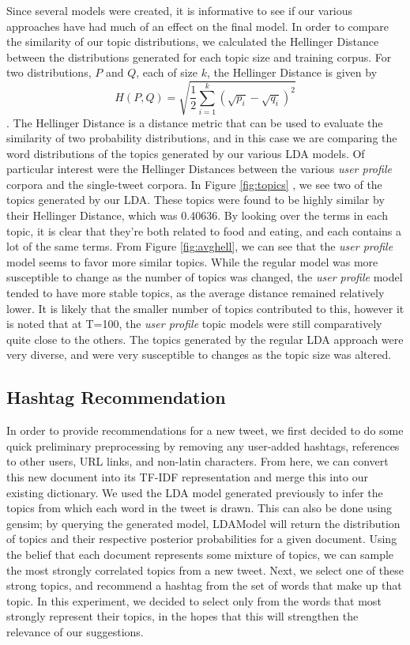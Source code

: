 \documentclass{acm_proc_article-sp}
\begin{document}
\hspace*{5mm}Since several models were created, it is informative to see if our various approaches have had much of an effect on the final model. In order to compare the similarity of our topic distributions, we calculated the Hellinger Distance between the distributions generated for each topic size and training corpus. For two distributions, $P$ and $Q$, each of size $k$, the Hellinger Distance is given by\[H(P,Q) = \sqrt{\frac{1}{2}\sum_{i=1}^{k}(\sqrt{p_{i}}-\sqrt{q_{i}})^2}\]. The Hellinger Distance is a distance metric that can be used to evaluate the similarity of two probability distributions, and in this case we are comparing the word distributions of the topics generated by our various LDA models. Of particular interest were the Hellinger Distances between the various \textit{user profile} corpora and the single-tweet corpora. In Figure \ref{fig:topics} , we see two of the topics generated by our LDA. These topics were found to be highly similar by their Hellinger Distance, which was 0.40636. By looking over the terms in each topic, it is clear that they're both related to food and eating, and each contains a lot of the same terms. From Figure \ref{fig:avghell}, we can see that the \textit{user profile} model seems to favor more similar topics. While the regular model was more susceptible to change as the number of topics was changed, the \textit{user profile} model tended to have more stable topics, as the average distance remained relatively lower. It is likely that the smaller number of topics contributed to this, however it is noted that at T=100, the \textit{user profile} topic models were still comparatively quite close to the others. The topics generated by the regular LDA approach were very diverse, and were very susceptible to changes as the topic size was altered.

\subsection{Hashtag Recommendation}
\hspace*{5mm}In order to provide recommendations for a new tweet, we first decided to do some quick preliminary preprocessing by removing any user-added hashtags, references to other users, URL links, and non-latin characters. From here, we can convert this new document into its TF-IDF representation and merge this into our existing dictionary. We used the LDA model generated previously to infer the topics from which each word in the tweet is drawn. This can also be done using gensim; by querying the generated model, LDAModel will return the distribution of topics and their respective posterior probabilities for a given document. Using the belief that each document represents some mixture of topics, we can sample the most strongly correlated topics from a new tweet. Next, we select one of these strong topics, and recommend a hashtag from the set of words that make up that topic. In this experiment, we decided to select only from the words that most strongly represent their topics, in the hopes that this will strengthen the relevance of our suggestions.\\
\end{document}
